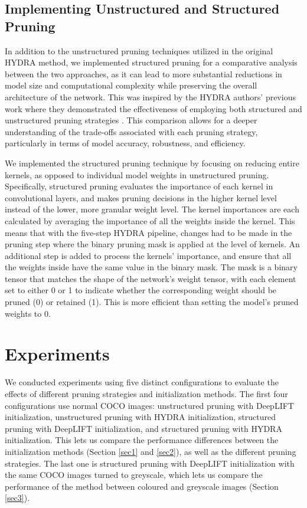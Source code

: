 \documentclass[journal,onecolumn,12pt]{IEEEtran}
\begin{document}
\subsection{Implementing Unstructured and Structured Pruning}
In addition to the unstructured pruning techniques utilized in the original HYDRA method, we implemented structured pruning for a comparative analysis between the two approaches, as it can lead to more substantial reductions in model size and computational complexity while preserving the overall architecture of the network. This was inspired by the HYDRA authors' previous work where they demonstrated the effectiveness of employing both structured and unstructured pruning strategies \cite{beforehydra}. This comparison allows for a deeper understanding of the trade-offs associated with each pruning strategy, particularly in terms of model accuracy, robustness, and efficiency.

We implemented the structured pruning technique by focusing on reducing entire kernels, as opposed to individual model weights in unstructured pruning. Specifically, structured pruning evaluates the importance of each kernel in convolutional layers, and makes pruning decisions in the higher kernel level instead of the lower, more granular weight level. The kernel importances are each calculated by averaging the importance of all the weights inside the kernel. This means that with the five-step HYDRA pipeline, changes had to be made in the pruning step where the binary pruning mask is applied at the level of kernels. An additional step is added to process the kernels' importance, and ensure that all the weights inside have the same value in the binary mask. The mask is a binary tensor that matches the shape of the network's weight tensor, with each element set to either 0 or 1 to indicate whether the corresponding weight should be pruned (0) or retained (1). This is more efficient than setting the model's pruned weights to 0.

\section{Experiments}

We conducted experiments using five distinct configurations to evaluate the effects of different pruning strategies and initialization methods. The first four configurations use normal COCO images: unstructured pruning with DeepLIFT initialization, unstructured pruning with HYDRA initialization, structured pruning with DeepLIFT initialization, and structured pruning with HYDRA initialization. This lets us compare the performance differences between the initialization methods (Section \ref{sec1} and \ref{sec2}), as well as the different pruning strategies. The last one is structured pruning with DeepLIFT initialization with the same COCO images turned to greyscale, which lets us compare the performance of the method between coloured and greyscale images (Section \ref{sec3}).
\end{document}
